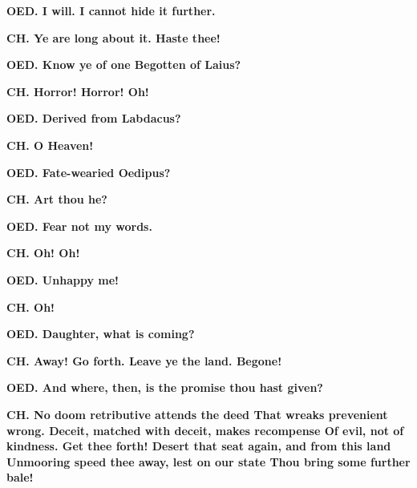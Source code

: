 \documentclass[11pt,letter]{book}
\begin{document}
\par \textbf{OED. I will. I cannot hide it further.}
\par 

\par \textbf{CH. Ye are long about it. Haste thee!}
\par 

\par \textbf{OED. Know ye of one Begotten of Laius?}
\par 

\par \textbf{CH. Horror! Horror! Oh!}
\par 

\par \textbf{OED. Derived from Labdacus?}
\par 

\par \textbf{CH. O Heaven!}
\par 

\par \textbf{OED. Fate-wearied Oedipus?}
\par 

\par \textbf{CH. Art thou he?}
\par 

\par \textbf{OED. Fear not my words.}
\par 

\par \textbf{CH. Oh! Oh!}
\par 

\par \textbf{OED. Unhappy me!}
\par 

\par \textbf{CH. Oh!}
\par 

\par \textbf{OED. Daughter, what is coming?}
\par 

\par \textbf{CH. Away! Go forth. Leave ye the land. Begone!}
\par 

\par \textbf{OED. And where, then, is the promise thou hast given?}
\par 

\par \textbf{CH. No doom retributive attends the deed That wreaks prevenient wrong. Deceit, matched with deceit, makes recompense Of evil, not of kindness. Get thee forth! Desert that seat again, and from this land Unmooring speed thee away, lest on our state Thou bring some further bale!}
\par 
\end{document}
